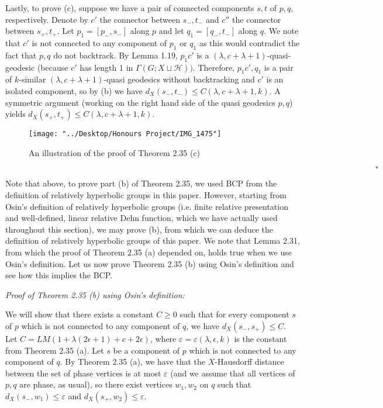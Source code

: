 \documentclass[12pt]{article}
\newcommand{\vs}{\vskip10pt}
\begin{document}
	\vs 
	
	Lastly, to prove (c), suppose we have a pair of connected components $s,t$ of $p,q$, respectively. Denote by $c'$ the connector between $s_-, t_-$ and $c''$ the connector between $s_+, t_+$. Let $p_1 = [p_-, s_-]$ along $p$ and let $q_1 = [q_-, t_-]$ along $q$. We note that $c'$ is not connected to any component of $p_1$ or $q_1$ as this would contradict the fact that $p,q$ do not backtrack. By Lemma 1.19, $p_1 c'$ is a $(\lambda, c + \lambda + 1)$-quasi-geodesic (because $c'$ has length 1 in $\Gamma(G; X \sqcup \mathcal{H}))$. Therefore, $p_1 c', q_1$ is a pair of $k$-similar $(\lambda, c + \lambda + 1)$-quasi geodesics without backtracking and $c'$ is an isolated component, so by (b) we have $d_X(s_-, t_-) \leq C(\lambda, c + \lambda + 1, k)$. A symmetric argument (working on the right hand side of the quasi geodesics $p,q$) yields $d_X(s_+, t_+) \leq C(\lambda, c + \lambda + 1, k)$.
	
\begin{figure} [H]
	\centering
	\texttt{[image: "../Desktop/Honours Project/IMG\_1475"]}
	\caption{An illustration of the proof of Theorem 2.35 (c)}
	\label{fig:img1475}
\end{figure}
	
	$\hspace{19cm} \square$
	
	Note that above, to prove part (b) of Theorem 2.35, we used BCP from the definition of relatively hyperbolic groups in this paper. However, starting from Osin's definition of relatively hyperbolic groups (i.e. finite relative presentation and well-defined, linear relative Dehn function, which we have actually used throughout this section), we may prove (b), from which we can deduce the definition of relatively hyperbolic groups of this paper. We note that Lemma 2.31, from which the proof of Theorem 2.35 (a) depended on, holds true when we use Osin's definition. Let us now prove Theorem 2.35 (b) using Osin's definition and see how this implies the BCP. 
	
	\vs 
	
	\textit{Proof of Theorem 2.35 (b) using Osin's definition: } 
	
	\vs 
	
	We will show that there exists a constant $C \geq 0$ such that for every component $s$ of $p$ which is not connected to any component of $q$, we have $d_X(s_-, s_+) \leq C$. Let $C = LM(1 + \lambda(2 \epsilon + 1) + c + 2 \epsilon)$, where $\varepsilon = \varepsilon(\lambda, \epsilon, k)$ is the constant from Theorem 2.35 (a). Let $s$ be a component of $p$ which is not connected to any component of $q$. By Theorem 2.35 (a), we have that the $X$-Hausdorff distance between the set of phase vertices is at most $\varepsilon$ (and we assume that all vertices of $p,q$ are phase, as usual), so there exist vertices $w_1, w_2$ on $q$ such that $d_X(s_-, w_1) \leq \varepsilon$ and $d_X(s_+, w_2) \leq \varepsilon$. 
	
\end{document}
